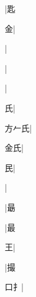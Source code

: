 \begin{multicols}{2}
{{\cjk{}{\cnsym{}　}{\cnsym{}　}{\cnsym{}　}}|{\cjk{}匙}\par
{\cjk{}{\cnsym{}　}{\cnsym{}　}金}|{}\par
{}|{}\par
{\cjk{}{\cnsym{}　}{\cnsym{}　}{\cnsym{}　}}|{}\par
{\cjk{}{\cnsym{}　}{\cnsym{}　}{\cnsym{}　}}|{}\par
{\cjk{}{\cnsym{}　}{\cnsym{}　}氏}|{}\par
{\cjk{}方{\cnxHanaA{}𠂉}氏}|{}\par
{\cjk{}{\cnsym{}　}金氏}|{}\par
{\cjk{}{\cnsym{}　}{\cnsym{}　}民}|{}\par
{\cjk{}{\cnsym{}　}{\cnsym{}　}{\cnsym{}　}}|{}\par
{\cjk{}{\cnsym{}　}{\cnsym{}　}{\cnsym{}　}}|{\cjk{}朂}\par
{\cjk{}{\cnsym{}　}{\cnsym{}　}{\cnsym{}　}}|{\cjk{}最}\par
{\cjk{}{\cnsym{}　}{\cnsym{}　}王}|{}\par
{}|{\cjk{}撮}\par
{\cjk{}{\cnsym{}　}口{扌}}|{}\par
}
\end{multicols}

